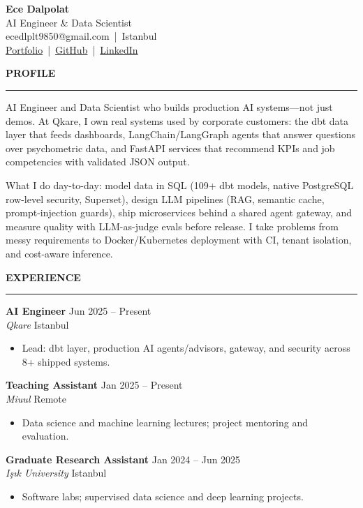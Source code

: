 \documentclass[11pt,a4paper]{article}
\newcommand{\cvsection}[1]{%
  \vspace{1.2em}%
  {\large\textbf{\MakeUppercase{#1}}}\\[0.2em]
  \hrule
  \vspace{0.6em}%
}
\newcommand{\jobentry}[4]{%
  \textbf{#1} \hfill {\small #2}\\
  \textit{#3} \hfill {\small #4}\\[0.2em]
}
\begin{document}
\begin{center}
  {\LARGE \textbf{Ece Dalpolat}}\\[0.4em]
  {\large AI Engineer \& Data Scientist}\\[0.4em]
  {\small
  ecedlplt9850@gmail.com \,|\, Istanbul\\[0.2em]
  \href{https://ecedalpolat.github.io/ece-dalpolat-portfolio/}{Portfolio} \,|\,
  \href{https://github.com/EceDalpolat}{GitHub} \,|\,
  \href{https://www.linkedin.com/in/ece-dalpolat-0265a0221/}{LinkedIn}
  }
\end{center}

\vspace{-0.5em}
\cvsection{Profile}

AI Engineer and Data Scientist who builds production AI systems---not just demos. At Qkare, I own real systems used by corporate customers: the dbt data layer that feeds dashboards, LangChain/LangGraph agents that answer questions over psychometric data, and FastAPI services that recommend KPIs and job competencies with validated JSON output.

What I do day-to-day: model data in SQL (109+ dbt models, native PostgreSQL row-level security, Superset), design LLM pipelines (RAG, semantic cache, prompt-injection guards), ship microservices behind a shared agent gateway, and measure quality with LLM-as-judge evals before release. I take problems from messy requirements to Docker/Kubernetes deployment with CI, tenant isolation, and cost-aware inference.

\cvsection{Experience}

\jobentry{AI Engineer}{Jun 2025 -- Present}{Qkare}{Istanbul}
\begin{itemize}[leftmargin=1.5em, nosep, topsep=2pt, itemsep=2pt]
  \item Lead: dbt layer, production AI agents/advisors, gateway, and security across 8+ shipped systems.
\end{itemize}
\vspace{0.6em}

\jobentry{Teaching Assistant}{Jan 2025 -- Present}{Miuul}{Remote}
\begin{itemize}[leftmargin=1.5em, nosep, topsep=2pt, itemsep=2pt]
  \item Data science and machine learning lectures; project mentoring and evaluation.
\end{itemize}
\vspace{0.6em}

\jobentry{Graduate Research Assistant}{Jan 2024 -- Jun 2025}{Işık University}{Istanbul}
\begin{itemize}[leftmargin=1.5em, nosep, topsep=2pt, itemsep=2pt]
  \item Software labs; supervised data science and deep learning projects.
\end{itemize}
\vspace{0.6em}
\end{document}
